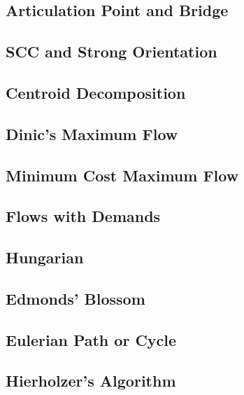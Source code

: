 \subsection{Articulation Point and Bridge}

\subsection{SCC and Strong Orientation}

\subsection{Centroid Decomposition}

\subsection{Dinic's Maximum Flow}

\subsection{Minimum Cost Maximum Flow}

\subsection{Flows with Demands}

\subsection{Hungarian}

\subsection{Edmonds' Blossom}

\subsection{Eulerian Path or Cycle}

\subsection{Hierholzer's Algorithm}


